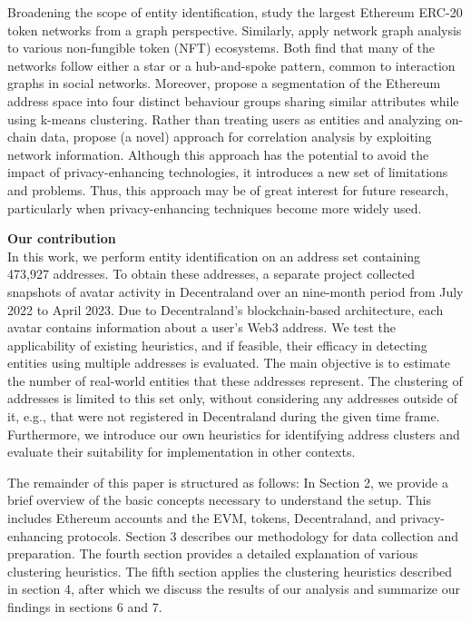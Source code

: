 \documentclass[12pt,a4paper,titlepage,oneside,english]{article}
\begin{document}
Broadening the scope of entity identification, \cite{victorlüders2019} study the largest Ethereum ERC-20 token networks from a graph perspective. Similarly, \cite{casalebrunet2021} apply network graph analysis to various non-fungible token (NFT) ecosystems. Both find that many of the networks follow either a star or a hub-and-spoke pattern, common to interaction graphs in social networks. Moreover, \cite{Payette2017} propose a segmentation of the Ethereum address space into four distinct behaviour groups sharing similar attributes while using k-means clustering. \newline
Rather than treating users as entities and analyzing on-chain data, \cite{yu2023} propose (a novel) approach for correlation analysis by exploiting network information. Although this approach has the potential to avoid the impact of privacy-enhancing technologies, it introduces a new set of limitations and problems. Thus, this approach may be of great interest for future research, particularly when privacy-enhancing techniques become more widely used.


\textbf{Our contribution}\\
In this work, we perform entity identification on an address set containing 473,927 addresses. To obtain these addresses, a separate project collected snapshots of avatar activity in Decentraland over an nine-month period from July 2022 to April 2023. Due to Decentraland's blockchain-based architecture, each avatar contains information about a user's Web3 address. \newline
We test the applicability of existing heuristics, and if feasible, their efficacy in detecting entities using multiple addresses is evaluated.
The main objective is to estimate the number of real-world entities that these addresses represent. The clustering of addresses is limited to this set only, without considering any %
 addresses outside of it, e.g., that were not registered in Decentraland during the given time frame. \newline
Furthermore, we introduce our own heuristics for identifying address clusters and evaluate their suitability for implementation in other contexts.

The remainder of this paper is structured as follows: In Section 2, we provide a brief overview of the basic concepts necessary to understand the setup. This includes Ethereum accounts and the EVM, tokens, Decentraland, and privacy-enhancing protocols. Section 3 describes our methodology for data collection and preparation. The fourth section provides a detailed explanation of various clustering heuristics. The fifth section applies the clustering heuristics described in section 4, after which we discuss the results of our analysis and summarize our findings in sections 6 and 7.
\end{document}
